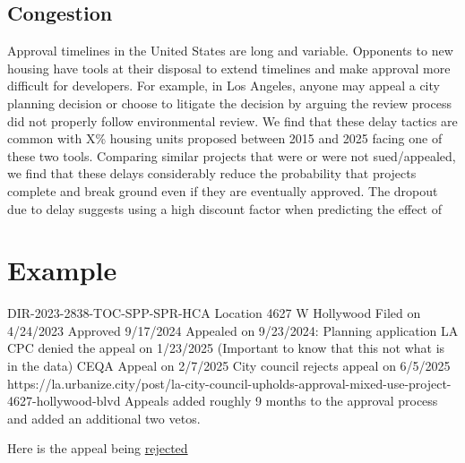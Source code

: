 \documentclass[12pt]{article}
\theoremstyle{definition}
\begin{document}
\subsection{Congestion}

Approval timelines in the United States are long and variable. Opponents to new housing have tools at their disposal to extend timelines and make approval more difficult for developers. For example, in Los Angeles, anyone may appeal a city planning decision or choose to litigate the decision by arguing the review process did not properly follow environmental review. We find that these delay tactics are common with X\% housing units proposed between 2015 and 2025 facing one of these two tools. Comparing similar projects that were or were not sued/appealed, we find that these delays considerably reduce the probability that projects complete and break ground even if they are eventually approved. The dropout due to delay suggests using a high discount factor when predicting the effect of 


\section{Example}
DIR-2023-2838-TOC-SPP-SPR-HCA
Location 4627 W Hollywood
Filed on 4/24/2023
Approved 9/17/2024
Appealed on 9/23/2024: Planning application
LA CPC denied the appeal on 1/23/2025 (Important to know that this not what is in the data)
CEQA Appeal on 2/7/2025
City council rejects appeal on 6/5/2025
https://la.urbanize.city/post/la-city-council-upholds-approval-mixed-use-project-4627-hollywood-blvd
Appeals added roughly 9 months to the approval process and added an additional two vetos. 

Here is the appeal being \hyperlink{https://cityclerk.lacity.org/lacityclerkconnect/index.cfm?fa=ccfi.viewrecord&cfnumber=25-0201}{rejected}
\end{document}
